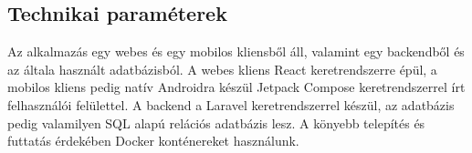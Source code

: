

\subsection{Technikai paraméterek}

Az alkalmazás egy webes és egy mobilos kliensből áll, valamint egy backendből és az általa használt adatbázisból. A webes kliens  React keretrendszerre épül, a mobilos kliens pedig natív Androidra készül Jetpack Compose keretrendszerrel írt felhasználói felülettel. A backend a Laravel keretrendszerrel készül, az adatbázis pedig valamilyen SQL alapú relációs adatbázis lesz. A könyebb telepítés és futtatás érdekében Docker konténereket használunk.